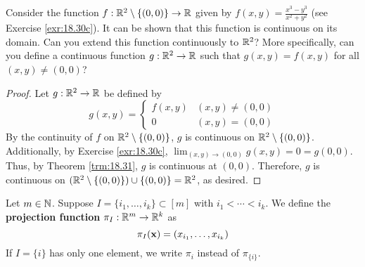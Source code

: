 \documentclass[../main.tex]{subfiles}
\begin{document}
\begin{exercise}\label{exr:18.33}
    Consider the function $f:\mathbb{R}^2\setminus\{(0,0)\}\to\mathbb{R}$ given by $f(x,y)=\frac{x^3-y^3}{x^2+y^2}$ (see Exercise \ref{exr:18.30c}). It can be shown that this function is continuous on its domain. Can you extend this function continuously to $\mathbb{R}^2$? More specifically, can you define a continuous function $g:\mathbb{R}^2\to\mathbb{R}$ such that $g(x,y)=f(x,y)$ for all $(x,y)\neq(0,0)$?
    \begin{proof}
        Let $g:\mathbb{R}^2\to\mathbb{R}$ be defined by
        \begin{equation*}
            g(x,y) =
            \begin{cases}
                f(x,y) & (x,y)\neq(0,0)\\
                0 & (x,y)=(0,0)
            \end{cases}
        \end{equation*}
        By the continuity of $f$ on $\mathbb{R}^2\setminus\{(0,0)\}$, $g$ is continuous on $\mathbb{R}^2\setminus\{(0,0)\}$. Additionally, by Exercise \ref{exr:18.30c}, $\lim_{(x,y)\to(0,0)}g(x,y)=0=g(0,0)$. Thus, by Theorem \ref{trm:18.31}, $g$ is continuous at $(0,0)$. Therefore, $g$ is continuous on $(\mathbb{R}^2\setminus\{(0,0)\})\cup\{(0,0)\}=\mathbb{R}^2$, as desired.
    \end{proof}
\end{exercise}

\begin{definition}\label{dfn:18.34}
    Let $m\in\mathbb{N}$. Suppose $I=\{i_1,\dots,i_k\}\subset[m]$ with $i_1<\cdots<i_k$. We define the \textbf{projection function} $\pi_I:\mathbb{R}^m\to\mathbb{R}^k$ as
    \begin{equation*}
        \pi_I(\mathbf{x}) = (x_{i_1},\dots,x_{i_k})
    \end{equation*}
    If $I=\{i\}$ has only one element, we write $\pi_i$ instead of $\pi_{\{i\}}$.
\end{definition}
\end{document}
